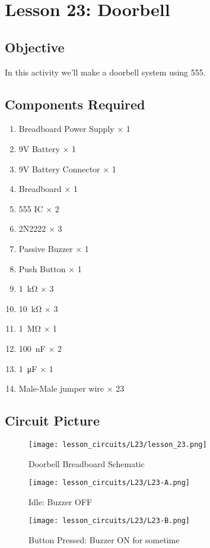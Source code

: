 \section{Lesson 23: Doorbell}
\subsection{Objective}
In this activity we'll make a doorbell system using 555.
\subsection{Components Required}
\begin{enumerate}
    \item Breadboard Power Supply $\times$ 1
    \item 9V Battery $\times$ 1
    \item 9V Battery Connector $\times$ 1
    \item Breadboard $\times$ 1
    \item 555 IC $\times$ 2
    \item 2N2222 $\times$ 3
    \item Passive Buzzer $\times$ 1
    \item Push Button $\times$ 1
    \item \SI{1}{\kilo\ohm} $\times$ 3
    \item \SI{10}{\kilo\ohm} $\times$ 3
    \item \SI{1}{\Mohm} $\times$ 1
    \item \SI{100}{\nano\farad} $\times$ 2
    \item \SI{1}{\micro\farad} $\times$ 1
    \item Male-Male jumper wire $\times$ 23
\end{enumerate}
\subsection{Circuit Picture}
\begin{figure}[!hp]
    \centering
    \texttt{[image: lesson\_circuits/L23/lesson\_23.png]}
    \caption{Doorbell Breadboard Schematic}
    \label{fig:555_doorbell_sch}
\end{figure}
\begin{figure}[!hp]
    \centering
    \texttt{[image: lesson\_circuits/L23/L23-A.png]}
    \caption{Idle: Buzzer OFF}
    \label{fig:555_doorbell_obb}
\end{figure}
\begin{figure}[!hp]
    \centering
    \texttt{[image: lesson\_circuits/L23/L23-B.png]}
    \caption{Button Pressed: Buzzer ON for sometime}
    \label{fig:555_doorbell_obb1}
\end{figure}
